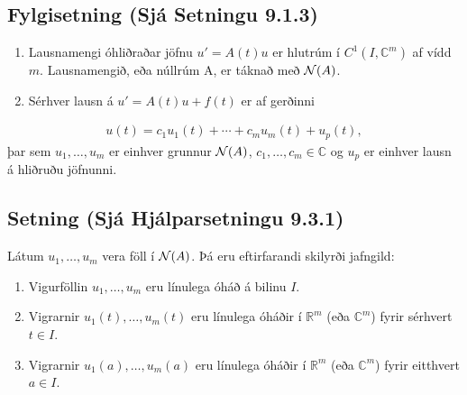 \documentclass[a4paper,10pt,icelandic]{sphinxmanual}
\begin{document}
\subsection{Fylgisetning (Sjá Setningu 9.1.3)}
\label{\detokenize{Kafli09:fylgisetning-sja-setningu-9-1-3}}\begin{enumerate}
%
\item {} 
Lausnamengi óhliðraðar jöfnu \(u'=A(t)u\) er hlutrúm í \(C^1(I, {\mathbb{C}}^m)\) af vídd \(m\). Lausnamengið, eða núllrúm A, er táknað með \({\cal N}(A)\).

\item {} 
Sérhver lausn á \(u'=A(t)u+f(t)\) er af gerðinni

\end{enumerate}
\begin{equation*}
\begin{split}u(t)=c_1u_1(t)+\cdots+c_mu_m(t)+u_p(t),\end{split}
\end{equation*}
þar sem \(u_1,\dots,u_m\) er einhver grunnur \({\cal N}(A)\), \(c_1,\dots,c_m\in{\mathbb{C}}\) og \(u_p\) er einhver lausn á hliðruðu jöfnunni.


\subsection{Setning (Sjá Hjálparsetningu 9.3.1)}
\label{\detokenize{Kafli09:setning-sja-hjalparsetningu-9-3-1}}
Látum \(u_1,\dots,u_m\) vera föll í \({\cal N}(A)\). Þá eru eftirfarandi skilyrði jafngild:
\begin{enumerate}
%
\item {} 
Vigurföllin \(u_1,\dots,u_m\) eru línulega óháð á bilinu \(I\).

\item {} 
Vigrarnir \(u_1(t),\dots,u_m(t)\) eru línulega óháðir í \(\mathbb{R}^ m\) (eða \({\mathbb{C}}^ m\)) fyrir sérhvert \(t\in I\).

\item {} 
Vigrarnir \(u_1(a),\dots,u_m(a)\) eru línulega óháðir í \(\mathbb{R}^ m\) (eða \({\mathbb{C}}^ m\)) fyrir eitthvert \(a\in I\).

\end{enumerate}
\end{document}
